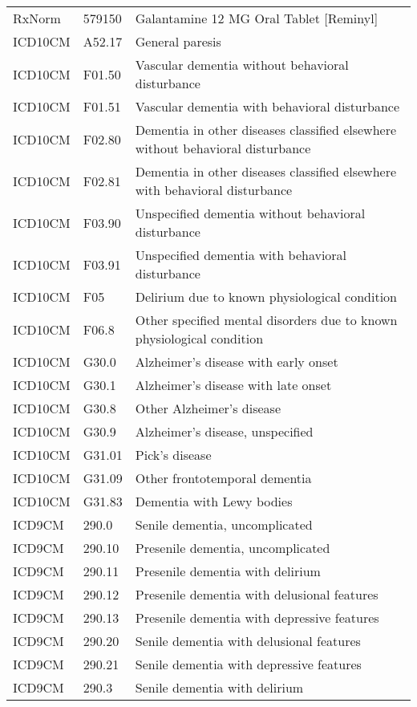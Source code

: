 \begin{longtable}{p{}p{}p{}}
  RxNorm & 579150 & Galantamine 12 MG Oral Tablet [Reminyl] \\ 
  ICD10CM & A52.17 & General paresis \\ 
  ICD10CM & F01.50 & Vascular dementia without behavioral disturbance \\ 
  ICD10CM & F01.51 & Vascular dementia with behavioral disturbance \\ 
  ICD10CM & F02.80 & Dementia in other diseases classified elsewhere without behavioral disturbance \\ 
  ICD10CM & F02.81 & Dementia in other diseases classified elsewhere with behavioral disturbance \\ 
  ICD10CM & F03.90 & Unspecified dementia without behavioral disturbance \\ 
  ICD10CM & F03.91 & Unspecified dementia with behavioral disturbance \\ 
  ICD10CM & F05 & Delirium due to known physiological condition \\ 
  ICD10CM & F06.8 & Other specified mental disorders due to known physiological condition \\ 
  ICD10CM & G30.0 & Alzheimer's disease with early onset \\ 
  ICD10CM & G30.1 & Alzheimer's disease with late onset \\ 
  ICD10CM & G30.8 & Other Alzheimer's disease \\ 
  ICD10CM & G30.9 & Alzheimer's disease, unspecified \\ 
  ICD10CM & G31.01 & Pick's disease \\ 
  ICD10CM & G31.09 & Other frontotemporal dementia \\ 
  ICD10CM & G31.83 & Dementia with Lewy bodies \\ 
  ICD9CM & 290.0 & Senile dementia, uncomplicated \\ 
  ICD9CM & 290.10 & Presenile dementia, uncomplicated \\ 
  ICD9CM & 290.11 & Presenile dementia with delirium \\ 
  ICD9CM & 290.12 & Presenile dementia with delusional features \\ 
  ICD9CM & 290.13 & Presenile dementia with depressive features \\ 
  ICD9CM & 290.20 & Senile dementia with delusional features \\ 
  ICD9CM & 290.21 & Senile dementia with depressive features \\ 
  ICD9CM & 290.3 & Senile dementia with delirium \\ 

\end{longtable}
